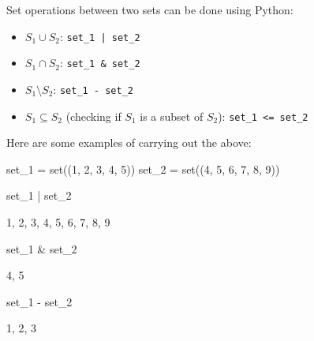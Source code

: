 Set operations between two sets can be done using Python:
\begin{itemize}
\item 

\(S_1 \cup S_2\): \texttt{set\_1 | set\_2}

\item 

\(S_1 \cap S_2\): \texttt{set\_1 \& set\_2}

\item 

\(S_1 \setminus S_2\): \texttt{set\_1 - set\_2}

\item 

\(S_1 \subseteq S_2\) (checking if \(S_1\) is a subset of \(S_2\)): \texttt{set\_1 <= set\_2}

\end{itemize}


Here are some examples of carrying out the above:




\begin{pyin}
set_1 = set((1, 2, 3, 4, 5))
set_2 = set((4, 5, 6, 7, 8, 9))

set_1 | set_2
\end{pyin}





\begin{raw}
{1, 2, 3, 4, 5, 6, 7, 8, 9}
\end{raw}







\begin{pyin}
set_1 & set_2
\end{pyin}





\begin{raw}
{4, 5}
\end{raw}







\begin{pyin}
set_1 - set_2
\end{pyin}





\begin{raw}
{1, 2, 3}
\end{raw}







